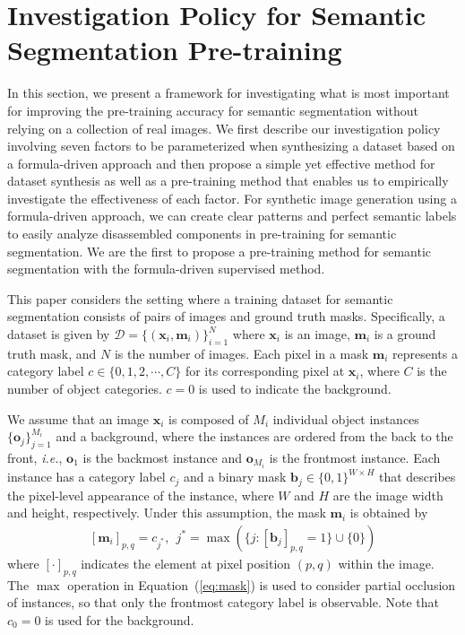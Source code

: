 \documentclass[10pt,twocolumn,letterpaper]{article}
\begin{document}
\section{Investigation Policy for Semantic Segmentation Pre-training}
\label{sec:investigation_policy}
In this section, we present a framework for investigating what is most important for improving the pre-training accuracy for semantic segmentation without relying on a collection of real images.
We first describe our investigation policy involving seven factors to be parameterized when synthesizing a dataset based on a formula-driven approach
and then propose a simple yet effective method for dataset synthesis as well as a pre-training method
that enables us to empirically investigate the effectiveness of each factor. For synthetic image generation using a formula-driven approach, we can create clear patterns and perfect semantic labels to easily analyze disassembled components in pre-training for semantic segmentation. We are the first to propose a pre-training method for semantic segmentation with the formula-driven supervised method.

This paper considers the setting where a training dataset for semantic segmentation consists of pairs of images and ground truth masks.
Specifically, a dataset is given by $\mathcal{D} = \{(\bm{x}_{i}, \bm{m}_{i})\}_{i=1}^{N}$ where $\bm{x}_{i}$ is an image, $\bm{m}_{i}$ is a ground truth mask, and $N$ is the number of images.
Each pixel in a mask $\bm{m}_{i}$ represents a category label $c \in \{0, 1, 2, \cdots, C\}$ for its corresponding pixel at $\bm{x}_{i}$, where $C$ is the number of object categories. $c=0$ is used to indicate the background.

We assume that an image $\bm{x}_{i}$ is composed of $M_{i}$ individual object instances $\{\bm{o}_{j}\}_{j=1}^{M_{i}}$ and a background, where the instances are ordered from the back to the front, {\it i.e.}, $\bm{o}_{1}$ is the backmost instance and $\bm{o}_{M_{i}}$ is the frontmost instance.
Each instance has a category label $c_{j}$ and a binary mask $\bm{b}_{j} \in \{0, 1\}^{W \times H}$ that describes the pixel-level appearance of the instance, where $W$ and $H$ are the image width and height, respectively.
Under this assumption, the mask $\bm{m}_{i}$ is obtained by
\begin{align}
\label{eq:mask}
[\bm{m}_{i}]_{p,q}
=
c_{j^{*}},~~
j^{*} = \max(\{j : [\bm{b}_{j}]_{p,q} = 1\} \cup \{0\})
\end{align}
where $[\cdot]_{p,q}$ indicates the element at pixel position $(p, q)$ within the image.
The $\max$ operation in Equation~(\ref{eq:mask}) is used to consider partial occlusion of instances, so that only the frontmost category label is observable.
Note that $c_{0} = 0$ is used for the background.
\end{document}
